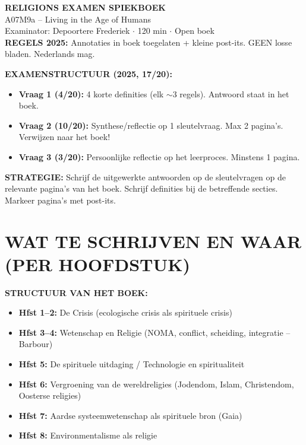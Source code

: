 \documentclass[a4paper,10pt]{article}
\begin{document}
\begin{center}
{\LARGE\bfseries RELIGIONS EXAMEN SPIEKBOEK}\\[4pt]
{\large A07M9a -- Living in the Age of Humans}\\[2pt]
{\normalsize Examinator: Depoortere Frederiek $\cdot$ 120 min $\cdot$ Open boek}\\[2pt]
{\small \textbf{REGELS 2025:} Annotaties in boek toegelaten + kleine post-its. GEEN losse bladen. Nederlands mag.}
\end{center}

\begin{exambox}
\textbf{EXAMENSTRUCTUUR (2025, 17/20):}
\begin{itemize}[noitemsep,topsep=2pt]
  \item \textbf{Vraag 1 (4/20):} 4 korte definities (elk $\sim$3 regels). Antwoord staat in het boek.
  \item \textbf{Vraag 2 (10/20):} Synthese/reflectie op 1 sleutelvraag. Max 2 pagina's. Verwijzen naar het boek!
  \item \textbf{Vraag 3 (3/20):} Persoonlijke reflectie op het leerproces. Minstens 1 pagina.
\end{itemize}
\textbf{STRATEGIE:} Schrijf de uitgewerkte antwoorden op de sleutelvragen op de relevante pagina's van het boek. Schrijf definities bij de betreffende secties. Markeer pagina's met post-its.
\end{exambox}

\vspace{4pt}

\section{WAT TE SCHRIJVEN EN WAAR (PER HOOFDSTUK)}

\begin{infobox}
\textbf{STRUCTUUR VAN HET BOEK:}
\begin{itemize}[noitemsep]
  \item \textbf{Hfst 1--2:} De Crisis (ecologische crisis als spirituele crisis)
  \item \textbf{Hfst 3--4:} Wetenschap en Religie (NOMA, conflict, scheiding, integratie -- Barbour)
  \item \textbf{Hfst 5:} De spirituele uitdaging / Technologie en spiritualiteit
  \item \textbf{Hfst 6:} Vergroening van de wereldreligies (Jodendom, Islam, Christendom, Oosterse religies)
  \item \textbf{Hfst 7:} Aardse systeemwetenschap als spirituele bron (Gaia)
  \item \textbf{Hfst 8:} Environmentalisme als religie
\end{itemize}
\end{infobox}
\end{document}
